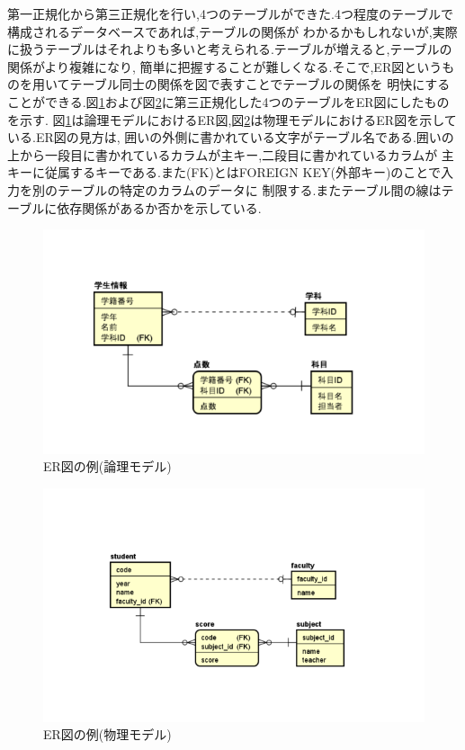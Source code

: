 \documentclass[a4j]{jarticle}
\begin{document}
    第一正規化から第三正規化を行い,4つのテーブルができた.4つ程度のテーブルで構成されるデータベースであれば,テーブルの関係が
    わかるかもしれないが,実際に扱うテーブルはそれよりも多いと考えられる.テーブルが増えると,テーブルの関係がより複雑になり,
    簡単に把握することが難しくなる.そこで,ER図というものを用いてテーブル同士の関係を図で表すことでテーブルの関係を
    明快にすることができる.図\ref{ronri}および図\ref{buturi}に第三正規化した4つのテーブルをER図にしたものを示す.
    図\ref{ronri}は論理モデルにおけるER図,図\ref{buturi}は物理モデルにおけるER図を示している.ER図の見方は,
    囲いの外側に書かれている文字がテーブル名である.囲いの上から一段目に書かれているカラムが主キー,二段目に書かれているカラムが
    主キーに従属するキーである.また(FK)とはFOREIGN KEY(外部キー)のことで入力を別のテーブルの特定のカラムのデータに
    制限する.またテーブル間の線はテーブルに依存関係があるか否かを示している.

    \begin{figure}[H]
      \centering
      \includegraphics[scale=1.4]{ronti.png}
      \caption{ER図の例(論理モデル)}
       \label{ronri}
      \end{figure}

      \begin{figure}[H]
        \centering
        \includegraphics[scale=1.4]{buturi.png}
        \caption{ER図の例(物理モデル)}
         \label{buturi}
        \end{figure}
\end{document}
